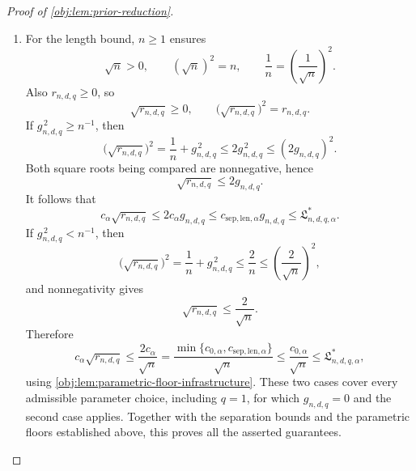 \begin{proof}[Proof of \cref{obj:lem:prior-reduction}]
\begin{enumerate}
\item For the length bound, \(n\ge1\) ensures
\[
\sqrt n>0,
\qquad
(\sqrt n)^2=n,
\qquad
\frac1n=\left(\frac1{\sqrt n}\right)^2.
\]
Also \(r_{n,d,q}\ge0\), so
\[
\sqrt{r_{n,d,q}}\ge0,
\qquad
\bigl(\sqrt{r_{n,d,q}}\bigr)^2=r_{n,d,q}.
\]
If \(g_{n,d,q}^{\,2}\ge n^{-1}\), then
\[
\bigl(\sqrt{r_{n,d,q}}\bigr)^2
=\frac1n+g_{n,d,q}^{\,2}
\le2g_{n,d,q}^{\,2}
\le(2g_{n,d,q})^2.
\]
Both square roots being compared are nonnegative, hence
\[
\sqrt{r_{n,d,q}}\le2g_{n,d,q}.
\]
It follows that
\[
c_\alpha\sqrt{r_{n,d,q}}
\le2c_\alpha g_{n,d,q}
\le c_{\mathrm{sep,len},\alpha}g_{n,d,q}
\le\mathfrak L^*_{n,d,q,\alpha}.
\]
If \(g_{n,d,q}^{\,2}<n^{-1}\), then
\[
\bigl(\sqrt{r_{n,d,q}}\bigr)^2
=\frac1n+g_{n,d,q}^{\,2}
\le\frac2n
\le\left(\frac2{\sqrt n}\right)^2,
\]
and nonnegativity gives
\[
\sqrt{r_{n,d,q}}\le\frac2{\sqrt n}.
\]
Therefore
\[
c_\alpha\sqrt{r_{n,d,q}}
\le\frac{2c_\alpha}{\sqrt n}
=\frac{\min\{c_{0,\alpha},c_{\mathrm{sep,len},\alpha}\}}{\sqrt n}
\le\frac{c_{0,\alpha}}{\sqrt n}
\le\mathfrak L^*_{n,d,q,\alpha},
\]
using \cref{obj:lem:parametric-floor-infrastructure}.
These two cases cover every admissible parameter choice, including
\(q=1\), for which \(g_{n,d,q}=0\) and the second case applies.
Together with the separation bounds and the parametric floors established
above, this proves all the asserted guarantees.
\end{enumerate}
\end{proof}
